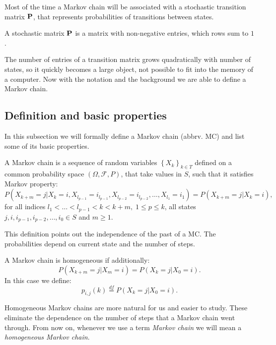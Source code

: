	Most of the time a Markov chain will be associated with a stochastic transition matrix $\mathbf{P}$, that represents probabilities of transitions between states.
	\begin{definition}
		A stochastic matrix $\mathbf{P}$ is a matrix with non-negative entries, which rows sum to $1$.
	\end{definition}
	The number of entries of a transition matrix grows quadratically with number of states, so it quickly becomes a large object, not possible to fit into the memory of a computer. Now with the notation and the background we are able to define a Markov chain.
	
\subsection{Definition and basic properties}
	In this subsection we will formally define a Markov chain (abbrv. MC) and list some of its basic properties.
	
	\begin{definition}
		A Markov chain is a sequence of random variables $\left\{X_k\right\}_{k \in T}$ defined on a common probability space $\left( \Omega, \mathcal{F}, P \right)$, that take values in $S$, such that it satisfies Markov property:
		\begin{equation*}
			P(X_{k+m} = j | X_k = i, X_{l_{p-1}} = i_{l_{p-1}}, X_{l_{p-2}} = i_{l_{p-2}}, \ldots, X_{l_1} = i_1) = P(X_{k+m} = j | X_k = i),
		\end{equation*}
		for all indices $l_1< \ldots < l_{p-1} < k < k+m, \; 1 \leq p \leq k$, all states $j, i, i_{p-1}, i_{p-2}, \ldots, i_0 \in S$ and $m \geq 1$.
	\end{definition}
	This definition points out the independence of the past of a MC. The probabilities depend on current state and the number of steps.

	\begin{definition}
		A Markov chain is homogeneous if additionally:
		\begin{equation*}
			P(X_{k+m} = j | X_m = i) = P(X_{k} = j | X_0 = i).
		\end{equation*}
		In this case we define:
		\begin{equation*}
			p_{i,j}(k) \overset{df}{=} P(X_{k} = j | X_0 = i).
		\end{equation*}
	\end{definition}
	Homogeneous Markov chains are more natural for us and easier to study. These eliminate the dependence on the number of steps that a Markov chain went through. From now on, whenever we use a term \textit{Markov chain} we will mean a \textit{homogeneous Markov chain}.
	
